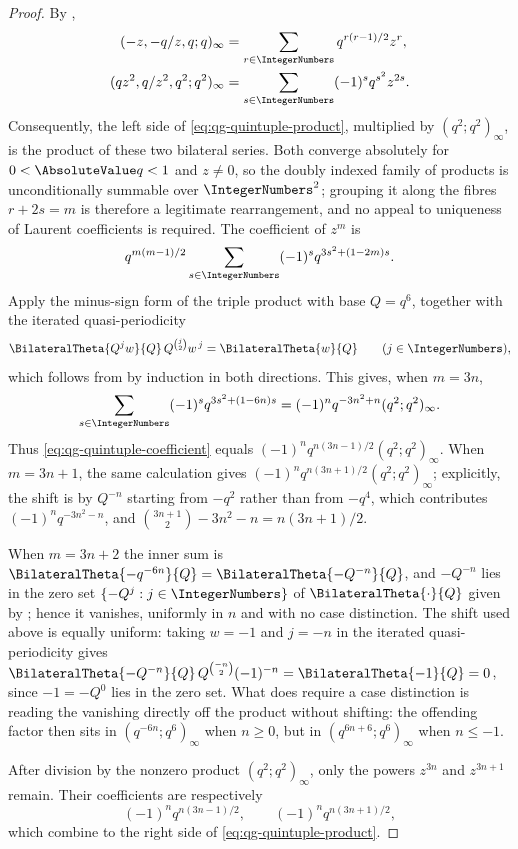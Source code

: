 \begin{proof}
By ,
\begin{align*}
 (-z,-q/z,q;q)_\infty
   &=\sum_{r\in\IntegerNumbers}q^{r(r-1)/2}z^r,\\
 (qz^2,q/z^2,q^2;q^2)_\infty
   &=\sum_{s\in\IntegerNumbers}(-1)^sq^{s^2}z^{2s}.
\end{align*}
Consequently, the left side of
\eqref{eq:qg-quintuple-product}, multiplied by $(q^2;q^2)_\infty$, is
the product of these two bilateral series.  Both converge absolutely for $0<\AbsoluteValue q<1$
and $z\ne0$, so the doubly indexed family of products is unconditionally summable over
$\IntegerNumbers^2$; grouping it along the fibres $r+2s=m$ is therefore a legitimate
rearrangement, and no appeal to uniqueness of Laurent coefficients is required.  The coefficient
of $z^m$ is
\begin{equation}
 q^{m(m-1)/2}\sum_{s\in\IntegerNumbers}(-1)^s
 q^{3s^2+(1-2m)s}.
\label{eq:qg-quintuple-coefficient}
\end{equation}
Apply the minus-sign form of the triple product with base $Q=q^6$, together with the iterated
quasi-periodicity
\[
 \BilateralTheta{Q^{j}w}{Q}\,Q^{\binom j2}w^{\,j}=\BilateralTheta{w}{Q}
 \qquad(j\in\IntegerNumbers),
\]
which follows from  by induction in both directions.  This gives, when
$m=3n$,
\[
 \sum_{s\in\IntegerNumbers}(-1)^sq^{3s^2+(1-6n)s}
 =(-1)^nq^{-3n^2+n}(q^2;q^2)_\infty.
\]
Thus \eqref{eq:qg-quintuple-coefficient} equals
$(-1)^nq^{n(3n-1)/2}(q^2;q^2)_\infty$.  When $m=3n+1$, the same
calculation gives
$(-1)^nq^{n(3n+1)/2}(q^2;q^2)_\infty$; explicitly, the shift is by $Q^{-n}$ starting from $-q^{2}$
rather than from $-q^{4}$, which contributes $(-1)^nq^{-3n^2-n}$, and
$\binom{3n+1}{2}-3n^2-n=n(3n+1)/2$.

When $m=3n+2$ the inner sum is $\BilateralTheta{-q^{-6n}}{Q}=\BilateralTheta{-Q^{-n}}{Q}$, and
$-Q^{-n}$ lies in the zero set $\{-Q^{j}:j\in\IntegerNumbers\}$ of $\BilateralTheta{\cdot}{Q}$
given by ; hence it vanishes, uniformly in $n$ and with no case
distinction.  The shift used above is equally uniform: taking $w=-1$ and $j=-n$ in the iterated
quasi-periodicity gives $\BilateralTheta{-Q^{-n}}{Q}\,Q^{\binom{-n}{2}}(-1)^{-n}
=\BilateralTheta{-1}{Q}=0$, since $-1=-Q^{0}$ lies in the zero set.  What does require a case
distinction is reading the vanishing directly off the product without shifting: the offending
factor then sits in $(q^{-6n};q^6)_\infty$ when $n\ge0$, but in $(q^{6n+6};q^6)_\infty$ when
$n\le-1$.

After division by the nonzero product $(q^2;q^2)_\infty$, only the powers
$z^{3n}$ and $z^{3n+1}$ remain.  Their coefficients are respectively
\[
 (-1)^nq^{n(3n-1)/2},
 \qquad
 (-1)^nq^{n(3n+1)/2},
\]
which combine to the right side of
\eqref{eq:qg-quintuple-product}.
\end{proof}


